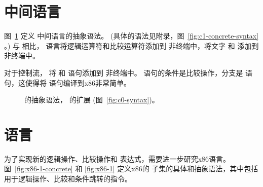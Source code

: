 \documentclass[11pt]{book}
\newcommand{\gray}[1]{{\color{gray} #1}}
\begin{document}
\section{ \LangCIf{} 中间语言}
\label{sec:Cif}

图~\ref{fig:c1-syntax} 定义
\LangCIf{} 中间语言的抽象语法。 (具体的语法见附录，图~\ref{fig:c1-concrete-syntax} 。)  与
\LangCVar{} 相比， \LangCIf{} 语言将逻辑运算符和比较运算符添加到 \Exp{} 非终端中，将文字  和
 添加到 \Arg{} 非终端中。

对于控制流， \LangCIf{} 将  和 
语句添加到 \Tail{} 非终端中。 
语句的条件是比较操作，分支是 
语句，这使得将  语句编译到x86非常简单。


\begin{figure}[tp]
\fbox{
\begin{minipage}{0.96\textwidth}
\small    
\[
\begin{array}{lcl}
\Atm &::=& \gray{\INT{\Int} \mid \VAR{\Var}} \mid \BOOL{\itm{bool}} \\
\itm{cmp} &::= & \key{eq?} \mid \key{<}  \\
\Exp &::= & \gray{ \Atm \mid \READ{} }\\
     &\mid& \gray{ \NEG{\Atm} \mid \ADD{\Atm}{\Atm} } \\
     &\mid& \UNIOP{\key{'not}}{\Atm} 
     \mid \BINOP{\key{'}\itm{cmp}}{\Atm}{\Atm} \\
\Stmt &::=& \gray{ \ASSIGN{\VAR{\Var}}{\Exp} } \\
\Tail &::= & \gray{\RETURN{\Exp} \mid \SEQ{\Stmt}{\Tail} } 
    \mid \GOTO{\itm{label}} \\
    &\mid& \IFSTMT{\BINOP{\itm{cmp}}{\Atm}{\Atm}}{\GOTO{\itm{label}}}{\GOTO{\itm{label}}} \\
\LangCIf{} & ::= & \gray{\CPROGRAM{\itm{info}}{\LP\LP\itm{label}\,\key{.}\,\Tail\RP\ldots\RP}}
\end{array}
\]
\end{minipage}
}
\caption{ \LangCIf{} 的抽象语法， \LangCVar{} 的扩展
  (图~\ref{fig:c0-syntax})。}
\label{fig:c1-syntax}
\end{figure}

\section{ \LangXIf{} 语言}
\label{sec:x86-if}

 为了实现新的逻辑操作、比较操作和  表达式，需要进一步研究x86语言。图~\ref{fig:x86-1-concrete} 和 \ref{fig:x86-1}
定义x86的 \LangXIf{} 子集的具体和抽象语法，其中包括用于逻辑操作、比较和条件跳转的指令。
\end{document}
